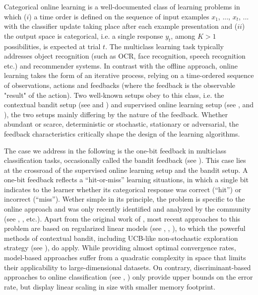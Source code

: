 \documentclass[preprint,12pt,authoryear]{elsarticle}
\begin{document}
Categorical online learning is a well-documented class of learning problems in which ($i$) a time order is defined on the sequence of input examples  $x_1$, ..., $x_t$, ... with the classifier update taking place after each example presentation and ($ii$) the output space is categorical, i.e. a single response $y_t$, among $K>1$ possibilities, is expected at trial $t$. The multiclass learning task typically addresses object recognition (such as OCR, face recognition, speech recognition etc.) and recommender systems. In contrast with the offline approach, online learning takes the form of an iterative process, relying on a time-ordered sequence of observations, actions and feedbacks (where the feedback is the observable "result" of the action).   
Two well-known setups obey to this class, i.e. the contextual bandit setup (see  \cite{lai1985asymptotically} and \cite{auer2002finite}) and supervised online learning setup (see  \cite{rosenblatt1958perceptron}, \cite{duda1973pattern} and \cite{freund1999large}), the two setups mainly differing by the nature of the feedback. Whether abundant or scarce, deterministic or stochastic, stationary or adversarial, the feedback characteristics critically shape the design of the learning algorithms.  

The case we address in the following is the one-bit feedback in multiclass classification tasks, occasionally called the bandit feedback (see \cite{kakade2008efficient}). This case lies at the crossroad of the supervised online learning setup and the bandit setup.  A one-bit feedback reflects a ``hit-or-miss'' learning situations, in which a single bit indicates to the learner whether its categorical response was correct (``hit'') or incorrect (``miss''). Wether simple in its principle, the problem is specific to the online approach and was only recently identified and analyzed by the community (see \cite{kakade2008efficient}, \cite{gentile2012multilabel}, etc.). 
Apart from the original work of \cite{kakade2008efficient}, most recent approaches to this problem are based on regularized linear models (see \cite{li2010contextual}, \cite{crammer2013multiclass}, \cite{ngo2013upper}), to which the powerful methods of contextual bandit, including UCB-like non-stochastic exploration strategy (see \cite{lai1985asymptotically}), do apply. While providing almost optimal convergence rates, model-based approaches suffer from a quadratic complexity in space that limits their applicability to large-dimensional datasets.  On contrary, discriminant-based approaches to online classification (see \cite{anlauf1989adatron}, \cite{crammer2006online}) only provide upper bounds on the error rate, but display linear scaling in size with smaller memory footprint. 
\end{document}
